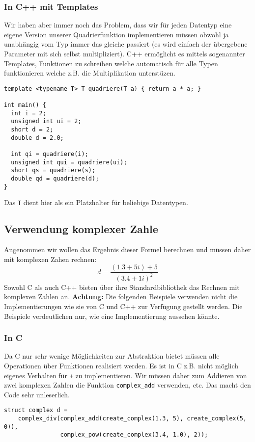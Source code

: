 \documentclass[11pt]{article}
\begin{document}
\subsubsection{In C++ mit Templates}
\label{sec-2-1-3}
Wir haben aber immer noch das Problem, dass wir für jeden Datentyp
eine eigene Version unserer Quadrierfunktion implementieren müssen
obwohl ja unabhängig vom Typ immer das gleiche passiert (es wird
einfach der übergebene Parameter mit sich selbst multipliziert). C++
ermöglicht es mittels sogenannter Templates, Funktionen zu schreiben
welche automatisch für alle Typen funktionieren welche z.B. die
Multiplikation unterstüzen.
\begin{verbatim}
template <typename T> T quadriere(T a) { return a * a; }

int main() {
  int i = 2;
  unsigned int ui = 2;
  short d = 2;
  double d = 2.0;

  int qi = quadriere(i);
  unsigned int qui = quadriere(ui);
  short qs = quadriere(s);
  double qd = quadriere(d);
}
\end{verbatim}
Das \verb~T~ dient hier als ein Platzhalter für beliebige Datentypen.
\subsection{Verwendung komplexer Zahle}
\label{sec-2-2}
Angenommen wir wollen das Ergebnis dieser Formel berechnen und müssen
daher mit komplexen Zahen rechnen: $$d=\frac{(1.3+5i)+5}{(3.4+1i)^2}$$
Sowohl C als auch C++ bieten über ihre Standardbibliothek das Rechnen
mit komplexen Zahlen an. \textbf{Achtung:} Die folgenden Beispiele verwenden
nicht die Implementierungen wie sie von C und C++ zur Verfügung
gestellt werden. Die Beispiele verdeutlichen nur, wie eine
Implementierung aussehen könnte.
\subsubsection{In C}
\label{sec-2-2-1}
Da C nur sehr wenige Möglichkeiten zur Abstraktion bietet müssen alle
Operationen über Funktionen realisiert werden. Es ist in C z.B. nicht
möglich eigenes Verhalten für \verb~+~ zu implementieren. Wir müssen daher
zum Addieren von zwei komplexen Zahlen die Funktion \verb~complex_add~
verwenden, etc. Das macht den Code sehr unleserlich.
\begin{verbatim}
struct complex d =
    complex_div(complex_add(create_complex(1.3, 5), create_complex(5, 0)),
                complex_pow(create_complex(3.4, 1.0), 2));
\end{verbatim}
\end{document}
